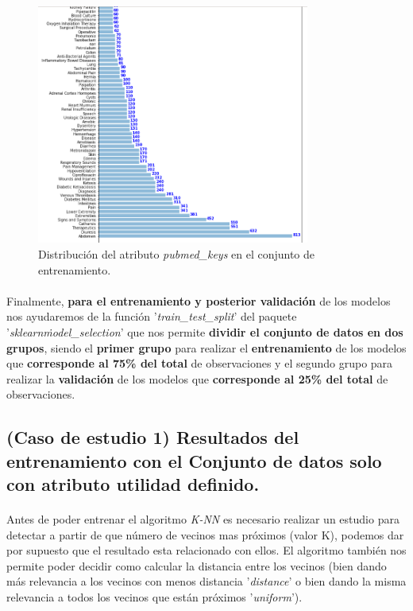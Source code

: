 \begin{figure}[!htb]
  \centering
    \includegraphics[width=0.8\textwidth]{images/resultados_knn_keywords.png}
    \caption{Distribución del atributo \textit{pubmed\_keys} en el conjunto de entrenamiento.}
  \label{knnDistKeywords}
\end{figure}

\paragraph{}
Finalmente, \textbf{para el entrenamiento y posterior validación} de los modelos nos ayudaremos de la función '\textit{train\_test\_split}'\cite{ref:knn_train_test_split} del paquete '\textit{sklearn\.model\_selection}' que nos permite \textbf{dividir el conjunto de datos en dos grupos}, siendo el \textbf{primer grupo} para realizar el \textbf{entrenamiento} de los modelos que \textbf{corresponde al 75\% del total} de observaciones y el segundo grupo para realizar la \textbf{validación} de los modelos que \textbf{corresponde al 25\% del total} de observaciones.

\subsection{(Caso de estudio 1) Resultados del entrenamiento con el Conjunto de datos solo con atributo utilidad definido.}

\paragraph{}
Antes de poder entrenar el algoritmo \textit{K-NN} es necesario realizar un estudio para detectar a partir de que número de vecinos mas próximos (valor K), podemos dar por supuesto que el resultado esta relacionado con ellos. El algoritmo también nos permite poder decidir como calcular la distancia entre los vecinos (bien dando más relevancia a los vecinos con menos distancia '\textit{distance}'\cite{ref:knn_doc} o bien dando la misma relevancia a todos los vecinos que están próximos '\textit{uniform}'\cite{ref:knn_doc}).

